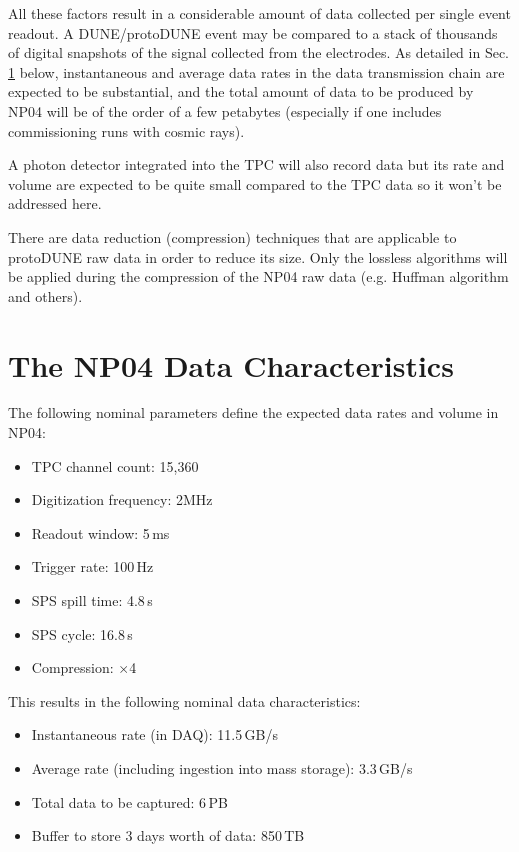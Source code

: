 \documentclass[a4paper]{jpconf}
\newcommand{\pd}{protoDUNE\xspace}
\begin{document}
\noindent All these factors result in a considerable amount of data collected per single event readout.
A DUNE/\pd event may be compared to a stack of thousands of digital  snapshots of the signal
collected from the electrodes.  As detailed in Sec.\,\ref{sec:np04_data_rate} below,
instantaneous and average data rates in the data transmission chain are expected to be substantial, 
and the total amount of data to be produced by NP04 will be of the order of a few
petabytes (especially if one includes commissioning runs with cosmic rays).

A photon detector integrated into the TPC will also record data but its rate and volume are
expected to be quite small compared to the TPC data so it won't be addressed here.

There are data reduction (compression) techniques that are applicable to \pd raw data in order to reduce its size. 
Only the lossless algorithms will be applied during the compression of the NP04 raw data
(e.g. Huffman algorithm and others).

\section{The NP04 Data Characteristics}
\label{sec:np04_data_rate}
The following nominal parameters define the expected data rates and volume in NP04:
\begin{itemize}
\item TPC channel count: 15,360
\item Digitization frequency: 2MHz
\item Readout window: 5\,ms
\item Trigger rate: 100\,Hz
\item SPS spill time: 4.8\,s
\item SPS cycle: 16.8\,s
\item Compression: $\times$4
\end{itemize}
\noindent This results in the following nominal data characteristics:
\begin{itemize}
\item Instantaneous rate (in DAQ): 11.5\,GB/s
\item Average rate (including ingestion into mass storage): 3.3\,GB/s
\item Total data to be captured: 6\,PB
\item Buffer to store 3 days worth of data: 850\,TB

\end{itemize}
\end{document}
